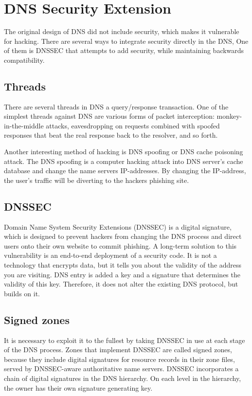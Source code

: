 \section{DNS Security Extension}
\label{DNS Security Extensions}
The original design of DNS did not include security, which makes it vulnerable for hacking.
There are several ways to integrate security directly in the DNS, One of them is DNSSEC that attempts to add security, while maintaining backwards compatibility.

\subsection{Threads}
There are several threads in DNS a query/response transaction.
One of the simplest threads against DNS are various forms of packet interception: monkey-in-the-middle attacks, eavesdropping on requests combined with spoofed responses that beat the real response back to the resolver, and so forth.

Another interesting method of hacking is DNS spoofing or DNS cache poisoning attack.
The DNS spoofing is a computer hacking attack into DNS server's cache database and change the name servers IP-addresses. By changing the IP-address, the user's traffic will be diverting to the hackers phishing site.

\subsection{DNSSEC}
Domain Name System Security Extensions (DNSSEC) is a digital signature, which is designed to prevent hackers from changing the DNS process and direct users onto their own website to commit phishing. A long-term solution to this vulnerability is an end-to-end deployment of a security code. It is not a technology that encrypts data, but it tells you about the validity of the address you are visiting. DNS entry is added a key and a signature that determines the validity of this key. Therefore, it does not alter the existing DNS protocol, but builds on it.

\subsection{Signed zones}
It is necessary to exploit it to the fullest by taking DNSSEC in use at each stage of the DNS process.
Zones that implement DNSSEC are called signed zones, because they include digital signatures for resource records in their zone files, served by DNSSEC-aware authoritative name servers.
DNSSEC incorporates a chain of digital signatures in the DNS hierarchy. On each level in the hierarchy, the owner has their own signature generating key.

